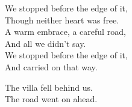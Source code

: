 \begin{lyrics}
We stopped before the edge of it,\\
Though neither heart was free.\\
A warm embrace, a careful road,\\
And all we didn’t say.\\
We stopped before the edge of it,\\
And carried on that way.

The villa fell behind us.\\
The road went on ahead.
\end{lyrics}

